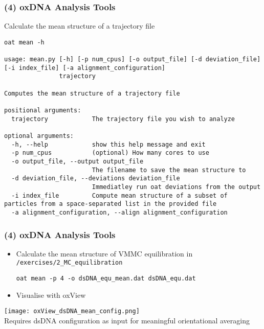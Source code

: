 \documentclass[slidestop,compress,9pt]{beamer}
\begin{document}
\begin{frame}[fragile]
\frametitle{(4) oxDNA Analysis Tools}

Calculate the mean structure of a trajectory file
\begin{lstlisting}
oat mean -h

usage: mean.py [-h] [-p num_cpus] [-o output_file] [-d deviation_file] [-i index_file] [-a alignment_configuration]
               trajectory

Computes the mean structure of a trajectory file

positional arguments:
  trajectory            The trajectory file you wish to analyze

optional arguments:
  -h, --help            show this help message and exit
  -p num_cpus           (optional) How many cores to use
  -o output_file, --output output_file
                        The filename to save the mean structure to
  -d deviation_file, --deviations deviation_file
                        Immediatley run oat deviations from the output
  -i index_file         Compute mean structure of a subset of particles from a space-separated list in the provided file
  -a alignment_configuration, --align alignment_configuration
\end{lstlisting}

\end{frame}
\begin{frame}[fragile]
\frametitle{(4) oxDNA Analysis Tools}

\begin{itemize}
\item Calculate the mean structure of VMMC equilibration in \texttt{/exercises/2\_MC\_equilibration}\\
\begin{lstlisting}
oat mean -p 4 -o dsDNA_equ_mean.dat dsDNA_equ.dat 
\end{lstlisting}
\item Visualise with oxView
\end{itemize}

\begin{center}
\texttt{[image: oxView\_dsDNA\_mean\_config.png]}\\
Requires dsDNA configuration as input for meaningful orientational averaging
\end{center}

\end{frame}
\end{document}
